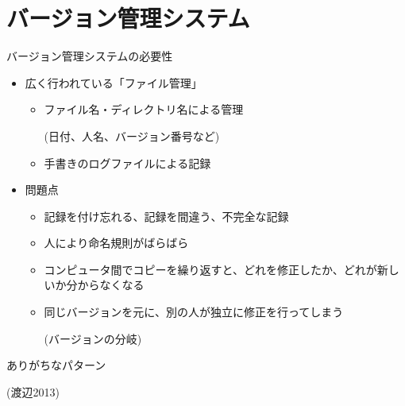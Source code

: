 \section{バージョン管理システム}

\begin{frame}[t,fragile]{バージョン管理システムの必要性}
  \begin{itemize}
    \setlength{\itemsep}{1em}
  \item 広く行われている「ファイル管理」
    \begin{itemize}
    \item ファイル名・ディレクトリ名による管理

      (日付、人名、バージョン番号など)
    \item 手書きのログファイルによる記録
    \end{itemize}
  \item 問題点
    \begin{itemize}
    \item 記録を付け忘れる、記録を間違う、不完全な記録
    \item 人により命名規則がばらばら
    \item コンピュータ間でコピーを繰り返すと、どれを修正したか、どれが新しいか分からなくなる
    \item 同じバージョンを元に、別の人が独立に修正を行ってしまう

      (バージョンの分岐)
    \end{itemize}
  \end{itemize}
\end{frame}

\begin{frame}[t,fragile]{ありがちなパターン}
  \vspace*{-1.8em}
  \begin{center}
  \end{center}
  \vspace*{-2em}
  {\footnotesize (渡辺2013)}
\end{frame}

